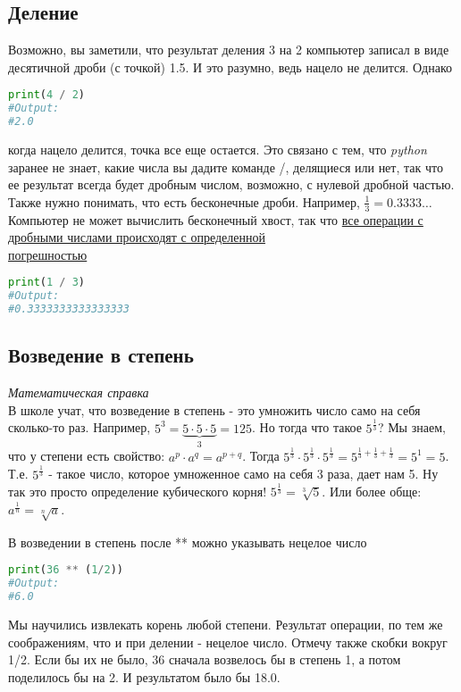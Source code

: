 \documentclass[12pt]{article} %
\newcommand \tab[1][1cm]{\hspace*{#1}}
\begin{document}
\subsection{Деление}
\tab Возможно, вы заметили, что результат деления 3 на 2 компьютер записал в виде десятичной дроби (с точкой) 1.5. И это разумно, ведь нацело не делится. Однако
\begin{lstlisting}[language=Python]
print(4 / 2)
#Output: 
#2.0
\end{lstlisting}
когда нацело делится, точка все еще остается. Это связано с тем, что \textit{python} заранее не знает, какие числа вы дадите команде /, делящиеся или нет, так что ее результат всегда будет дробным числом, возможно, с нулевой дробной частью.\\
\tab Также нужно понимать, что есть бесконечные дроби. Например, $\frac{1}{3} = 0.3333\ldots$ Компьютер не может вычислить бесконечный хвост, так что \underline{все операции с дробными числами происходят с определенной}\\ \underline{погрешностью}
\begin{lstlisting}[language=Python]
print(1 / 3)
#Output: 
#0.3333333333333333
\end{lstlisting} 
\subsection{Возведение в степень}
\begin{tcolorbox}
	\textit{Математическая справка}\\
	\tab В школе учат, что возведение в степень - это умножить число само на себя сколько-то раз. Например, $5 ^ 3 = \underbrace{5 \cdot 5 \cdot 5}_{3} = 125$. Но тогда что такое $5 ^ {\frac{1}{3}}$? Мы знаем, что у степени есть свойство: $a^p \cdot a^q = a^{p + q}$. Тогда $5^{\frac{1}{3}} \cdot 5^{\frac{1}{3}} \cdot 5^{\frac{1}{3}} = 5 ^ {\frac{1}{3} + \frac{1}{3} + \frac{1}{3} } = 5 ^ 1 = 5$. Т.е. $5 ^ {\frac{1}{3}}$ - такое число, которое умноженное само на себя 3 раза, дает нам 5. Ну так это просто определение кубического корня! $5 ^ {\frac{1}{3}} = \sqrt[3]{5}$. Или более обще: $a ^ {\frac{1}{n}} = \sqrt[n]{a}$.  
\end{tcolorbox}
В возведении в степень после ** можно указывать нецелое число
\begin{lstlisting}[language=Python]
print(36 ** (1/2))
#Output: 
#6.0
\end{lstlisting}
\tab Мы научились извлекать корень любой степени. Результат операции, по тем же соображениям, что и при делении - нецелое число. Отмечу также скобки вокруг 1/2. Если бы их не было, 36 сначала возвелось бы в степень 1, а потом поделилось бы на 2. И результатом было бы 18.0.
\end{document}
